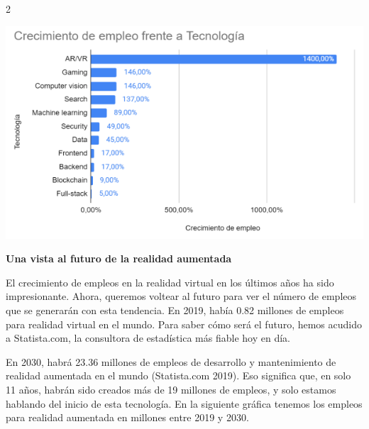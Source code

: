 \documentclass[12pt,spanish,Letterpaper,openany]{book}
\begin{document}
\begin {multicols}{2}
\begin {flushleft}
\noindent\begin{minipage}[c]{\columnwidth}
\centering

\includegraphics[width=1\linewidth]{images/pareja27_image2}

\end{minipage}
\end {flushleft}

\textbf{Una vista al futuro de la realidad aumentada}

El crecimiento de empleos en la realidad virtual en los últimos años ha sido impresionante. Ahora, queremos voltear al futuro para ver el número de empleos que se generarán con esta tendencia. En 2019, había 0.82 millones de empleos para realidad virtual en el mundo. Para saber cómo será el futuro, hemos acudido a Statista.com, la consultora de estadística más fiable hoy en día.

En 2030, habrá 23.36 millones de empleos de desarrollo y mantenimiento de realidad aumentada en el mundo (Statista.com 2019). Eso significa que, en solo 11 años, habrán sido creados más de 19 millones de empleos, y solo estamos hablando del inicio de esta tecnología. En la siguiente gráfica tenemos los empleos para realidad aumentada en millones entre 2019 y 2030.

\begin {flushleft}
\noindent\begin{minipage}[c]{\columnwidth}


\end{minipage}
\end{flushleft}
\end{multicols}
\end{document}
